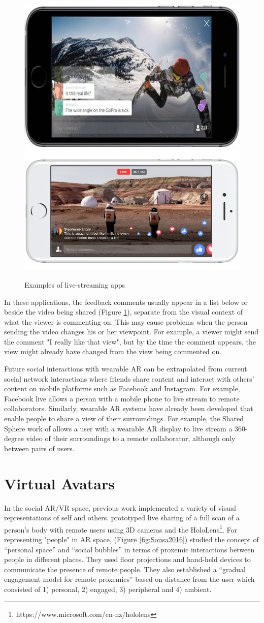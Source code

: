 \begin{figure}
    \centering
    \includegraphics[width=.4\linewidth]{images/periscope.png}
    \includegraphics[width=.4\linewidth]{images/facebook-live.png}
    \caption{Examples of live-streaming apps}
    \label{fig:live-streaming}
\end{figure}

In these applications, the feedback comments usually appear in a list below or beside the video being shared (Figure \ref{fig:live-streaming}), separate from the visual context of what the viewer is commenting on. This may cause problems when the person sending the video changes his or her viewpoint. For example, a viewer might send the comment "I really like that view", but by the time the comment appears, the view might already have changed from the view being commented on.

Future social interactions with wearable AR can be extrapolated from current social network interactions where friends share content and interact with others' content on mobile platforms such as Facebook and Instagram. For example, Facebook live allows a person with a mobile phone to live stream to remote collaborators. Similarly, wearable AR systems have already been developed that enable people to share a view of their surroundings. For example, the Shared Sphere work of \cite{lee2017mixed} allows a user with a wearable AR display to live stream a 360-degree video of their surroundings to a remote collaborator, although only between pairs of users. 

\section{Virtual Avatars}

In the social AR/VR space, previous work implemented a variety of visual representations of self and others. \cite{Fanello2016} prototyped live sharing of a full scan of a person's body with remote users using 3D cameras and the HoloLens\footnote{https://www.microsoft.com/en-nz/hololens}. For representing "people" in AR space, \cite{Sousa2016} (Figure \ref{fig:Sousa2016}) studied the concept of \enquote{personal space} and \enquote{social bubbles} in terms of proxemic interactions between people in different places. They used floor projections and hand-held devices to communicate the presence of remote people. They also established a \enquote{gradual engagement model for remote proxemics} based on distance from the user which consisted of 1) personal, 2) engaged, 3) peripheral and 4) ambient.

